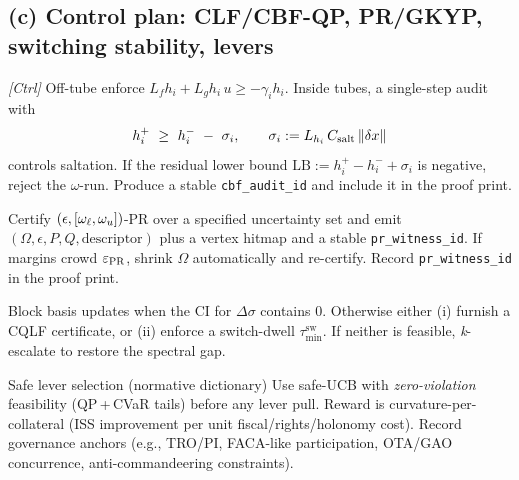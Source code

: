 \subsection{(c) Control plan: CLF/CBF-QP, PR/GKYP, switching stability, levers}\label{subsec:ops-ctrl}
\emph{}

\begin{lemma}\label{lem:cbf-salt}
\emph{[\textup{Ctrl}]}
Off-tube enforce $L_f h_i + L_g h_i\,u \ge -\gamma_i h_i$. Inside tubes, a single-step audit with
\[
h_i^+\ \ge\ h_i^-\ -\ \sigma_i,\qquad \sigma_i:= L_{h_i}\,C_{\mathrm{salt}}\,\|\delta x\|
\]
controls saltation. If the residual lower bound $\mathrm{LB}:=h_i^+-h_i^-+\sigma_i$ is negative, reject the $\omega$-run. Produce a stable \texttt{cbf\_audit\_id} and include it in the proof print.
\end{lemma}

\begin{proposition}\label{prop:gkyp-witness}
Certify $(\epsilon,[\omega_{\ell},\omega_{u}])$-PR over a specified uncertainty set and emit $(\Omega,\epsilon,P,Q,\text{descriptor})$ plus a vertex hitmap and a stable \texttt{pr\_witness\_id}. If margins crowd $\varepsilon_{\mathrm{PR}}$, shrink $\Omega$ automatically and re-certify. Record \texttt{pr\_witness\_id} in the proof print.
\end{proposition}

\begin{lemma}\label{lem:switching}
Block basis updates when the CI for $\Delta\sigma$ contains $0$. Otherwise either (i) furnish a CQLF certificate, or (ii) enforce a switch-dwell $\tau_{\min}^{\mathrm{sw}}$. If neither is feasible, \emph{k}-escalate to restore the spectral gap.
\end{lemma}

\begin{rulex}{Safe lever selection (normative dictionary)}\label{rule:levers}
Use safe-UCB with \emph{zero-violation} feasibility (QP\,+\,CVaR tails) before any lever pull. Reward is curvature-per-collateral (ISS improvement per unit fiscal/rights/holonomy cost). Record governance anchors (e.g., TRO/PI, FACA-like participation, OTA/GAO concurrence, anti-commandeering constraints).
\end{rulex}

